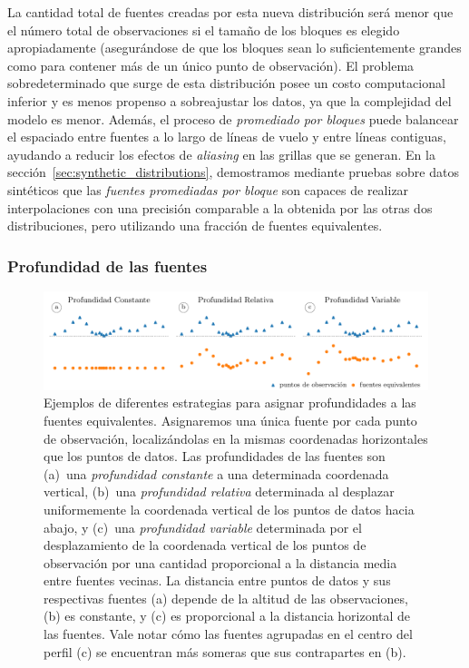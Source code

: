 La cantidad total de fuentes creadas por esta nueva distribución será menor que
el número total de observaciones si el tamaño de los bloques es elegido
apropiadamente (asegurándose de que los bloques sean lo suficientemente grandes
como para contener más de un único punto de observación).
El problema sobredeterminado que surge de esta distribución posee un costo
computacional inferior y es menos propenso a sobreajustar los datos, ya que la
complejidad del modelo es menor.
Además, el proceso de \emph{promediado por bloques} puede balancear el
espaciado entre fuentes a lo largo de líneas de vuelo y entre líneas contiguas,
ayudando a reducir los efectos de \emph{aliasing} en las grillas que se
generan.
En la sección~\ref{sec:synthetic_distributions}, demostramos mediante pruebas
sobre datos sintéticos que las \emph{fuentes promediadas por bloque} son
capaces de realizar interpolaciones con una precisión comparable a la obtenida
por las otras dos distribuciones, pero utilizando una fracción de fuentes
equivalentes.


\subsubsection{Profundidad de las fuentes}

\begin{figure}[tb]
    \includegraphics[width=\linewidth]{figs/eql-gradient-boosted/depth_types.pdf}
    \caption{
        Ejemplos de diferentes estrategias para asignar profundidades a las
        fuentes equivalentes.
        Asignaremos una única fuente por cada punto de observación,
        localizándolas en la mismas coordenadas horizontales que los puntos de
        datos.
        Las profundidades de las fuentes son
        (a)~una \emph{profundidad constante} a una determinada coordenada
        vertical,
        (b)~una \emph{profundidad relativa} determinada al desplazar
        uniformemente la coordenada vertical de los puntos de datos hacia
        abajo, y
        (c)~una \emph{profundidad variable} determinada por el desplazamiento
        de la coordenada vertical de los puntos de observación por una cantidad
        proporcional a la distancia media entre fuentes vecinas.
        La distancia entre puntos de datos y sus respectivas fuentes (a)
        depende de la altitud de las observaciones, (b) es constante, y (c) es
        proporcional a la distancia horizontal de las fuentes.
        Vale notar cómo las fuentes agrupadas en el centro del perfil (c) se
        encuentran más someras que sus contrapartes en (b).
    }
    \label{fig:depth_types}
\end{figure}

